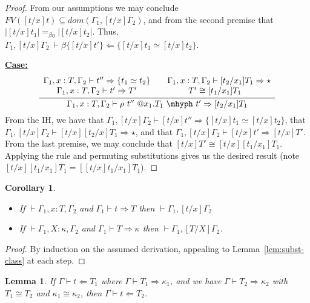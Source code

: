 \documentclass{article}
\newcommand{\tpcheck}[0]{\Leftarrow}
\newcommand{\tpsynth}[0]{\Rightarrow}
\newcommand{\startcase}[1]{\vspace{#1} \noindent\textbf{\underline{Case:}}}
\newtheorem{lemma}[theorem]{Lemma}
\newtheorem{corollary}[theorem]{Corollary}
\begin{document}
\begin{proof}
  From our assumptions we may conclude \(\textit{FV}([t/x]t) \subseteq
  \textit{dom}(\Gamma_1,[t/x]\Gamma_2)\), and from the second premise that
  \(|[t/x]t_1| =_{\beta\eta} |[t/x]t_2|\).
  Thus, \(\Gamma_1,[t/x]\Gamma_2\ \vdash \beta\{[t/x]t'\}\tpcheck \{[t/x]t_1
  \simeq [t/x]t_2\}\).

  \startcase{.2cm}
  \[
    \infer{\Gamma_1,x:T,\Gamma_2 \vdash \rho\ t''\ @x_1.T_1\ \mhyph\ t' \tpsynth [t_2/x_1]T_1}
    {
      \begin{array}{cc}
        \Gamma_1,x:T,\Gamma_2 \vdash t'' \tpsynth \{t_1 \simeq t_2\}
        & \quad \Gamma_1,x:T,\Gamma_2 \vdash [t_2/x_1]T_1 \tpsynth \star
        \\ \Gamma_1,x:T,\Gamma_2 \vdash t' \tpsynth T'
        & T' \cong [t_1/x_1]T_1
      \end{array}
    }
  \]
  From the IH, we have that \(\Gamma_1,[t/x]\Gamma_2 \vdash [t/x]t'' \tpsynth \{[t/x]t_1
  \simeq [t/x]t_2\}\), that \(\Gamma_1,[t/x]\Gamma_2 \vdash [t/x][t_2/x]T_1
  \tpsynth \star\), and that \(\Gamma_1,[t/x]\Gamma_2 \vdash [t/x]t' \tpsynth
  [t/x]T'\).
  From the last premise, we may conclude that \([t/x]T' \cong
  [t/x][t_1/x_1]T_1\).
  Applying the rule and permuting substitutions gives us the desired result
  (note \([t/x][t_1/x_1]T_1 = [[t/x]t_1/x_1]T_1\)).
\end{proof}

\begin{corollary}
  \ \\
  \begin{itemize}
  \item If \(\vdash \Gamma_1,x:T,\Gamma_2\) and \(\Gamma_1 \vdash t \tpsynth T\)
    then \(\vdash \Gamma_1,[t/x]\Gamma_2\)
    
  \item If \(\vdash \Gamma_1,X:\kappa,\Gamma_2\) and \(\Gamma_1 \vdash T
    \tpsynth \kappa\) then \(\vdash \Gamma_1,[T/X]\Gamma_2\).
  \end{itemize}
\end{corollary}
\begin{proof}
  By induction on the assumed derivation, appealing to
  Lemma~\ref{lem:subst-class} at each step.
\end{proof}

\begin{lemma}
  \label{lem:tpcheck-conv}
  If \(\Gamma \vdash t \tpcheck T_1\) where \(\Gamma \vdash T_1 \tpsynth
  \kappa_1\), and we have \(\Gamma \vdash T_2 \tpsynth \kappa_2\) with \(T_1
  \cong T_2\) and \(\kappa_1 \cong \kappa_2\), then \(\Gamma \vdash t \tpcheck T_2\).
\end{lemma}
\end{document}
